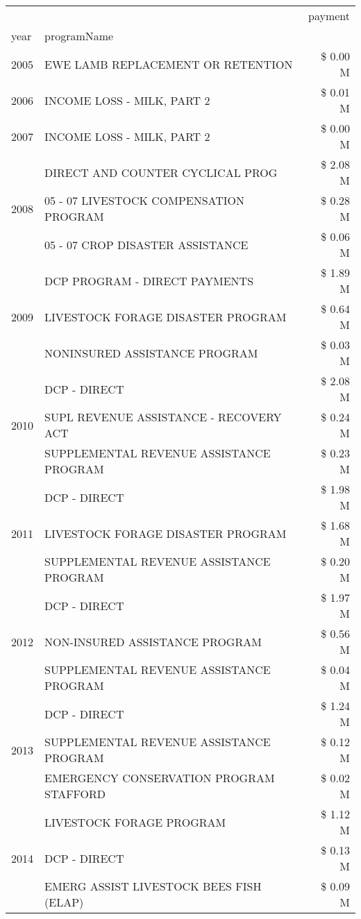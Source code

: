 \begin{tabular}{llr}
\toprule
 &  & payment \\
year & programName &  \\
\midrule
2005 & EWE LAMB REPLACEMENT OR RETENTION & \$ 0.00 M \\
\cline{1-3}
2006 & INCOME LOSS - MILK, PART 2 & \$ 0.01 M \\
\cline{1-3}
2007 & INCOME LOSS - MILK, PART 2 & \$ 0.00 M \\
\cline{1-3}
\multirow[t]{3}{*}{2008} & DIRECT AND COUNTER CYCLICAL PROG & \$ 2.08 M \\
 & 05 - 07 LIVESTOCK COMPENSATION PROGRAM & \$ 0.28 M \\
 & 05 - 07 CROP DISASTER ASSISTANCE & \$ 0.06 M \\
\cline{1-3}
\multirow[t]{3}{*}{2009} & DCP PROGRAM - DIRECT PAYMENTS & \$ 1.89 M \\
 & LIVESTOCK FORAGE DISASTER  PROGRAM & \$ 0.64 M \\
 & NONINSURED ASSISTANCE PROGRAM & \$ 0.03 M \\
\cline{1-3}
\multirow[t]{3}{*}{2010} & DCP - DIRECT & \$ 2.08 M \\
 & SUPL REVENUE ASSISTANCE - RECOVERY ACT & \$ 0.24 M \\
 & SUPPLEMENTAL REVENUE ASSISTANCE PROGRAM & \$ 0.23 M \\
\cline{1-3}
\multirow[t]{3}{*}{2011} & DCP - DIRECT & \$ 1.98 M \\
 & LIVESTOCK FORAGE DISASTER PROGRAM & \$ 1.68 M \\
 & SUPPLEMENTAL REVENUE ASSISTANCE PROGRAM & \$ 0.20 M \\
\cline{1-3}
\multirow[t]{3}{*}{2012} & DCP - DIRECT & \$ 1.97 M \\
 & NON-INSURED ASSISTANCE PROGRAM & \$ 0.56 M \\
 & SUPPLEMENTAL REVENUE ASSISTANCE PROGRAM & \$ 0.04 M \\
\cline{1-3}
\multirow[t]{3}{*}{2013} & DCP - DIRECT & \$ 1.24 M \\
 & SUPPLEMENTAL REVENUE ASSISTANCE PROGRAM & \$ 0.12 M \\
 & EMERGENCY CONSERVATION PROGRAM STAFFORD & \$ 0.02 M \\
\cline{1-3}
\multirow[t]{3}{*}{2014} & LIVESTOCK FORAGE PROGRAM & \$ 1.12 M \\
 & DCP - DIRECT & \$ 0.13 M \\
 & EMERG ASSIST LIVESTOCK BEES FISH (ELAP) & \$ 0.09 M \\

\end{tabular}
